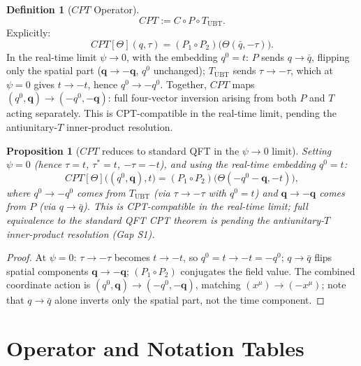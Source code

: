 \documentclass[12pt,a4paper]{article}
\newtheorem{proposition}[theorem]{Proposition}
\theoremstyle{definition}
\newtheorem{definition}[theorem]{Definition}
\theoremstyle{remark}
\begin{document}
\begin{definition}[$CPT$ Operator]
\label{def:ds:CPT}
\begin{equation}
  CPT := C \circ P \circ T_{\mathrm{UBT}}.
  \label{eq:ds:CPT}
\end{equation}
Explicitly:
\begin{equation}
  CPT[\Theta](q,\tau)
  = (P_1\circ P_2)\bigl(\Theta(\bar{q},-\tau)\bigr).
  \label{eq:ds:CPT_explicit}
\end{equation}
In the real-time limit $\psi\to0$, with the embedding $q^0 = t$:
$P$ sends $q\to\bar{q}$, flipping only the spatial part
($\mathbf{q}\to-\mathbf{q}$, $q^0$ unchanged);
$T_{\mathrm{UBT}}$ sends $\tau\to-\tau$, which at $\psi=0$ gives $t\to-t$,
hence $q^0\to-q^0$.
Together, $CPT$ maps $(q^0,\mathbf{q})\to(-q^0,-\mathbf{q})$: full
four-vector inversion arising from both $P$ and $T$ acting separately.
This is CPT-compatible in the real-time limit, pending the antiunitary-$T$
inner-product resolution.
\end{definition}

\begin{proposition}[$CPT$ reduces to standard QFT in the $\psi\to0$ limit]
\label{prop:ds:CPT_limit}
Setting $\psi=0$ (hence $\tau=t$, $\tau^*=t$, $-\tau=-t$), and using
the real-time embedding $q^0=t$:
\begin{equation}
  CPT[\Theta]\bigl((q^0,\mathbf{q}),t\bigr)
  = (P_1\circ P_2)\bigl(\Theta(-q^0 - \mathbf{q}, -t)\bigr),
\end{equation}
where $q^0\to-q^0$ comes from $T_{\mathrm{UBT}}$ (via $\tau\to-\tau$ with $q^0=t$)
and $\mathbf{q}\to-\mathbf{q}$ comes from $P$ (via $q\to\bar{q}$).
This is CPT-compatible in the real-time limit; full equivalence to the
standard QFT CPT theorem is pending the antiunitary-$T$ inner-product
resolution (Gap S1).
\end{proposition}
\begin{proof}
At $\psi=0$: $\tau\to-\tau$ becomes $t\to-t$, so $q^0=t\to-t=-q^0$;
$q\to\bar{q}$ flips spatial components $\mathbf{q}\to-\mathbf{q}$;
$(P_1\circ P_2)$ conjugates the field value.
The combined coordinate action is $(q^0,\mathbf{q})\to(-q^0,-\mathbf{q})$,
matching $(x^\mu)\to(-x^\mu)$; note that $q\to\bar{q}$ alone inverts only
the spatial part, not the time component.
\end{proof}

\section{Operator and Notation Tables}
\label{sec:ds:tables}
\end{document}
